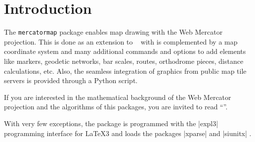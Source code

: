\clearpage
\section{Introduction}%

The \texttt{mercatormap} package enables map drawing with the
Web Mercator projection. This is done as an extension to
\tikzname\ \cite{package:tikz} with is complemented by a map
coordinate system and many additional commands and options to add elements
like markers, geodetic networks, bar scales, routes, orthodrome
pieces, distance calculations, etc. Also, the seamless integration of graphics
from public map tile servers is provided through a Python script.

If you are interested in the mathematical background of the Web Mercator projection
and the algorithms of this packages, you are invited to read
\enquote{}.

With very few exceptions, the package is programmed with the
|expl3| \cite{package:expl3} programming interface for \LaTeX3
and loads the packages
|xparse| \cite{package:xparse} and |siunitx| \cite{package:siunitx}.

\medskip


%



